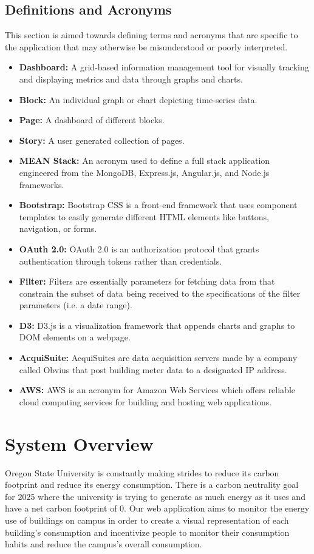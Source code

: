 \documentclass[journal,10pt,onecolumn,compsoc]{IEEEtran}
\begin{document}
    \subsection{Definitions and Acronyms}
    This section is aimed towards defining terms and acronyms that are specific to the application that may otherwise be misunderstood or poorly interpreted.
    \begin{itemize}
        \item \textbf{Dashboard:}
            A grid-based information management tool for visually tracking and displaying metrics and data through graphs and charts.
        \item \textbf{Block:} 
            An individual graph or chart depicting time-series data.
        \item \textbf{Page:} 
            A dashboard of different blocks. 
        \item \textbf{Story:} 
            A user generated collection of pages. 
        \item \textbf{MEAN Stack:} 
            An acronym used to define a full stack application engineered from the MongoDB, Express.js, Angular.js, and Node.js frameworks. 
        \item \textbf{Bootstrap:} 
            Bootstrap CSS is a front-end framework that uses component templates to easily generate different HTML elements like buttons, navigation, or forms. 
        \item \textbf{OAuth 2.0:} 
            OAuth 2.0 is an authorization protocol that grants authentication through tokens rather than credentials. 
        \item \textbf{Filter:} 
            Filters are essentially parameters for fetching data from that constrain the subset of data being received to the specifications of the filter parameters (i.e. a date range). 
        \item \textbf{D3:} 
            D3.js is a visualization framework that appends charts and graphs to DOM elements on a webpage. 
        \item \textbf{AcquiSuite:} 
            AcquiSuites are data acquisition servers made by a company called Obvius that post building meter data to a designated IP address.
        \item \textbf{AWS:} 
            AWS is an acronym for Amazon Web Services which offers reliable cloud computing services for building and hosting web applications.
    \end{itemize}
    \section{System Overview} 
    Oregon State University is constantly making strides to reduce its carbon footprint and reduce its energy consumption. There is a carbon neutrality goal for 2025 where the university is trying to generate as much energy as it uses and have a net carbon footprint of 0. Our web application aims to monitor the energy use of buildings on campus in order to create a visual representation of each building's consumption and incentivize people to monitor their consumption habits and reduce the campus's overall consumption.
\end{document}
